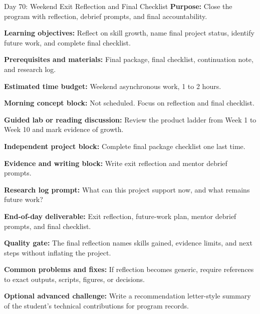 \begin{dailybox}{Day 70: Weekend Exit Reflection and Final Checklist}
\textbf{Purpose:} Close the program with reflection, debrief prompts, and final accountability.

\textbf{Learning objectives:} Reflect on skill growth, name final project status, identify future work, and complete final checklist.

\textbf{Prerequisites and materials:} Final package, final checklist, continuation note, and research log.

\textbf{Estimated time budget:} Weekend asynchronous work, 1 to 2 hours.

\textbf{Morning concept block:} Not scheduled. Focus on reflection and final checklist.

\textbf{Guided lab or reading discussion:} Review the product ladder from Week 1 to Week 10 and mark evidence of growth.

\textbf{Independent project block:} Complete final package checklist one last time.

\textbf{Evidence and writing block:} Write exit reflection and mentor debrief prompts.

\textbf{Research log prompt:} What can this project support now, and what remains future work?

\textbf{End-of-day deliverable:} Exit reflection, future-work plan, mentor debrief prompts, and final checklist.

\textbf{Quality gate:} The final reflection names skills gained, evidence limits, and next steps without inflating the project.

\textbf{Common problems and fixes:} If reflection becomes generic, require references to exact outputs, scripts, figures, or decisions.

\textbf{Optional advanced challenge:} Write a recommendation letter-style summary of the student's technical contributions for program records.
\end{dailybox}
